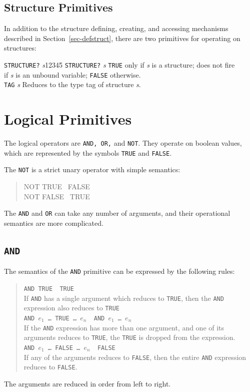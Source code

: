 \subsection{Structure Primitives}

	In addition to the structure defining, creating, and accessing
mechanisms described in Section~\ref{sec-defstruct}, there are two
primitives for operating on structures:  
\begin{tabbing}
{\tt STRUCTURE?} {\sl s}12345\=\kill
{\tt STRUCTURE?} {\sl s} \> {\tt TRUE} only if {\sl s} is a structure;
does not fire \\ \> if {\sl s} is an unbound variable; {\tt FALSE}
otherwise.\\
{\tt TAG} {\sl s} \> Reduces to the type tag of structure {\sl s}.
\end{tabbing}
	

\section{Logical Primitives}

	The logical operators are {\tt AND, OR,} and {\tt NOT}.  They operate
on boolean values, which are represented by the symbols {\tt TRUE} and
{\tt FALSE}.  

	The {\tt NOT} is a strict unary operator with simple semantics: 
\begin{quote}\begin{tt}
	NOT TRUE \reds\  FALSE\\
	NOT FALSE \reds\  TRUE
\end{tt}\end{quote}
The {\tt AND} and {\tt OR} can take any number of arguments, and their
operational semantics are more complicated.  

\subsection{\tt AND}

	The semantics of the {\tt AND} primitive can be expressed by the
following rules:
\begin{quote}
	{\tt AND TRUE \reds\  TRUE}\\
		 If {\tt AND} has a single argument which
reduces to {\tt TRUE}, then the {\tt AND} expression also reduces to
{\tt TRUE}\\[.10in]
	{\tt AND $e_1$ \ldots\ TRUE \ldots\ $e_n$ \reds\  AND $e_1$ \ldots\ $e_n$
}\\
		If the {\tt AND} expression has more than one argument, and one of
its arguments reduces to {\tt TRUE}, the {\tt TRUE} is dropped from the
expression.\\[.10in]
	{\tt AND $e_1$ \ldots\ FALSE \ldots\ $e_n$ \reds\  FALSE}\\
	  If any of the arguments reduces to {\tt FALSE}, then the entire {\tt AND}
expression reduces to {\tt FALSE}.
\end{quote}
The arguments are reduced in order from left to right.

